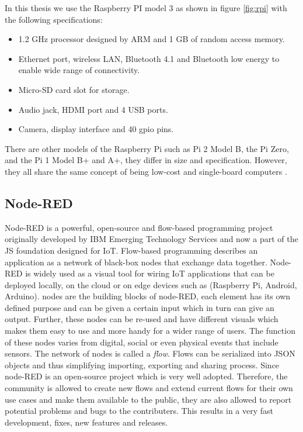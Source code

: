 In this thesis we use the Raspberry PI model 3 as shown in figure \ref{fig:rpi} with the following specifications:
\begin{itemize}
	\item 1.2 GHz processor designed by ARM and 1 GB of random access memory.
	\item Ethernet port, wireless LAN, Bluetooth 4.1 and Bluetooth low energy to enable wide range of connectivity.
	\item Micro-SD card slot for storage.
	\item Audio jack, HDMI port and 4 USB ports.
	\item Camera, display interface and 40 gpio pins.
\end{itemize}

There are other models of the Raspberry Pi such as  Pi 2 Model B, the Pi Zero, and the Pi 1 Model B+ and A+, they differ in size and specification. However, they all share the same concept of being low-cost and single-board computers \cite{RaspberryPi}.



\subsection{Node-RED}
Node-RED \cite{NODE-RED} is a powerful, open-source and flow-based programming project originally developed by IBM Emerging Technology Services and now a part of the JS foundation designed for IoT. Flow-based programming describes an application as a network of black-box nodes that exchange data together.  Node-RED is widely used as a visual tool for wiring IoT applications that can be deployed locally, on the cloud or on edge devices such as (Raspberry Pi, Android, Arduino). nodes are the building blocks of node-RED, each element has its own defined purpose and can be given a certain input which in turn can give an output. Further, these nodes can be re-used and  have different visuals which makes them easy to use and more handy for a wider range of users. The function of these nodes varies from digital, social  or even physical events that include sensors. The network of nodes is called a  \textit{flow}. Flows can be  serialized into JSON objects and thus simplifying  importing, exporting and sharing process. Since node-RED is an open-source project which is very well adopted. Therefore, the community is allowed to create new flows and extend current flows for their own use cases and make them available to the public, they are also allowed to report potential problems and bugs to the contributers. This results in a very fast development, fixes, new features and releases.\\

